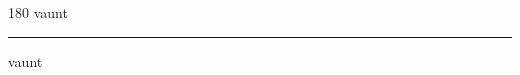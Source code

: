 
\begin{frame}
\begin{center}
\begin{turn}{180}
{\fontsize{2.5cm}{1em}\selectfont vaunt}
\end{turn}
\vspace{1em}\par  
\hrule
\vspace{1em}\par  
{\fontsize{2.5cm}{1em}\selectfont vaunt}
\end{center}
\end{frame}
